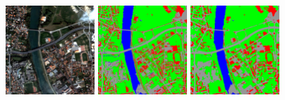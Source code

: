 \begin{figure}[!h]
  \center
  \includegraphics[width=0.3\textwidth]{../Art/MonteverdiImages/classification_chain_inputimage.jpg}
  \includegraphics[width=0.3\textwidth]{../Art/MonteverdiImages/classification_chain_fancyclassif_CMR_input.png}
  \includegraphics[width=0.3\textwidth]{../Art/MonteverdiImages/classification_chain_fancyclassif_CMR_3.png}
  \label{fig:ClassificationMapRegularizationApplication}
\end{figure}

